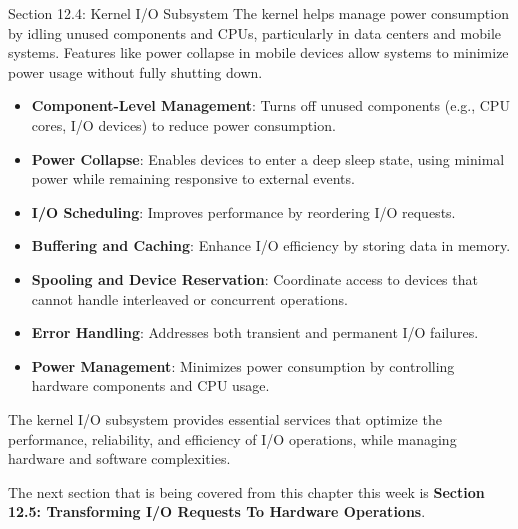 \begin{notes}{Section 12.4: Kernel I/O Subsystem}
    The kernel helps manage power consumption by idling unused components and CPUs, particularly in data centers and mobile systems. Features like power collapse in mobile devices allow systems to 
    minimize power usage without fully shutting down.
    
    \begin{highlight}
    
        \begin{itemize}
            \item \textbf{Component-Level Management}: Turns off unused components (e.g., CPU cores, I/O devices) to reduce power consumption.
            \item \textbf{Power Collapse}: Enables devices to enter a deep sleep state, using minimal power while remaining responsive to external events.
        \end{itemize}
    
    \end{highlight}
    
    \begin{highlight}
    
        \begin{itemize}
            \item \textbf{I/O Scheduling}: Improves performance by reordering I/O requests.
            \item \textbf{Buffering and Caching}: Enhance I/O efficiency by storing data in memory.
            \item \textbf{Spooling and Device Reservation}: Coordinate access to devices that cannot handle interleaved or concurrent operations.
            \item \textbf{Error Handling}: Addresses both transient and permanent I/O failures.
            \item \textbf{Power Management}: Minimizes power consumption by controlling hardware components and CPU usage.
        \end{itemize}
    
    The kernel I/O subsystem provides essential services that optimize the performance, reliability, and efficiency of I/O operations, while managing hardware and software complexities.
    
    \end{highlight}
\end{notes}

The next section that is being covered from this chapter this week is \textbf{Section 12.5: Transforming I/O Requests To Hardware Operations}.

